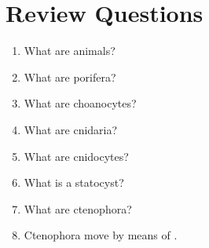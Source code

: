 \section{Review Questions}\label{review-questions-3}

\begin{enumerate}
\def\labelenumi{\arabic{enumi}.}
\tightlist
\item
  What are animals?
\item
  What are porifera?
\item
  What are choanocytes?
\item
  What are cnidaria?
\item
  What are cnidocytes?
\item
  What is a statocyst?
\item
  What are ctenophora?
\item
  Ctenophora move by means of \underline{\phantom{answer}}.
\end{enumerate}
